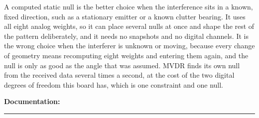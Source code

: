 \documentclass{exam}
\begin{document}
\begin{questions}
\begin{parts}
	\begin{solutionorlines}[2.4in]
	A computed static null is the better choice when the interference sits in a
	known, fixed direction, such as a stationary emitter or a known clutter
	bearing. It uses all eight analog weights, so it can place several nulls at
	once and shape the rest of the pattern deliberately, and it needs no snapshots
	and no digital channels. It is the wrong choice when the interferer is unknown
	or moving, because every change of geometry means recomputing eight weights
	and entering them again, and the null is only as good as the angle that was
	assumed. MVDR finds its own null from the received data several times a
	second, at the cost of the two digital degrees of freedom this board has,
	which is one constraint and one null.
	\end{solutionorlines}

\end{parts}

\end{questions}

\vspace{1.0em}
\noindent\textbf{Documentation:} \rule[-2pt]{0.6\linewidth}{0.4pt}
\end{document}
